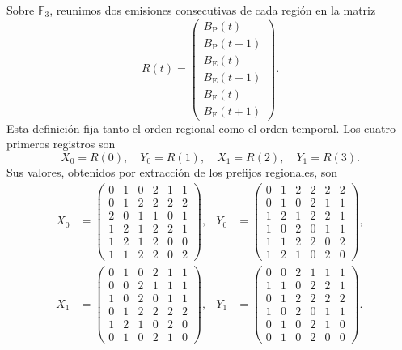 Sobre \(\mathbb F_3\), reunimos dos emisiones consecutivas de cada región
en la matriz
\begin{equation}
 R(t)=
 \begin{pmatrix}
 B_{\mathrm P}(t)\\ B_{\mathrm P}(t+1)\\
 B_{\mathrm E}(t)\\ B_{\mathrm E}(t+1)\\
 B_{\mathrm F}(t)\\ B_{\mathrm F}(t+1)
 \end{pmatrix}.
 \label{eq:df-registro-matricial}
\end{equation}
Esta definición fija tanto el orden regional como el orden temporal. Los
cuatro primeros registros son
\[
 X_0=R(0),\quad Y_0=R(1),\quad X_1=R(2),\quad Y_1=R(3).
\]
Sus valores, obtenidos por extracción de los prefijos regionales, son
\begin{align*}
 X_0&=\begin{pmatrix}
0&1&0&2&1&1\\0&1&2&2&2&2\\2&0&1&1&0&1\\
1&2&1&2&2&1\\1&2&1&2&0&0\\1&1&2&2&0&2
\end{pmatrix},&
 Y_0&=\begin{pmatrix}
0&1&2&2&2&2\\0&1&0&2&1&1\\1&2&1&2&2&1\\
1&0&2&0&1&1\\1&1&2&2&0&2\\1&2&1&0&2&0
\end{pmatrix},\\[1ex]
 X_1&=\begin{pmatrix}
0&1&0&2&1&1\\0&0&2&1&1&1\\1&0&2&0&1&1\\
0&1&2&2&2&2\\1&2&1&0&2&0\\0&1&0&2&1&0
\end{pmatrix},&
 Y_1&=\begin{pmatrix}
0&0&2&1&1&1\\1&1&0&2&2&1\\0&1&2&2&2&2\\
1&0&2&0&1&1\\0&1&0&2&1&0\\0&1&0&2&0&0
\end{pmatrix}.
\end{align*}


